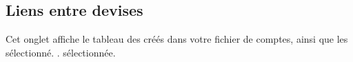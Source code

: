 %
%


\subsection{Liens entre devises\label{setup-resources-rate}}

Cet onglet affiche le tableau des  créés dans votre fichier de comptes, ainsi que les  \ifIllustration sélectionné. . 
\else sélectionnée.
\fi





